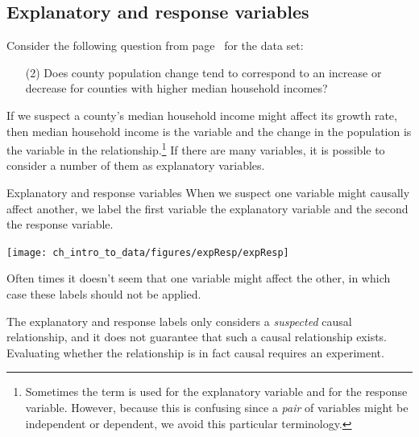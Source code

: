 
\subsection{Explanatory and response variables}
\label{explanatoryAndResponse}



Consider the following question from
page~\pageref{pop_change_v_median_hh_income_question}
for the  data set:
\begin{enumerate}
\item[(2)]
    Does county population change tend to correspond to an increase
    or decrease for counties with higher median household incomes?
\end{enumerate}
If we suspect a county's median household income might affect
its growth rate,
then median household income is the
variable and the change in the population is the
 variable in the
relationship.\footnote{Sometimes the term
 is used for
the explanatory variable and  for
the response variable.
However, because this is confusing since a \emph{pair} of
variables might be independent or dependent, we avoid this
particular terminology.}
If there are many variables, it is possible to consider
a number of them as explanatory variables.


\begin{onebox}{Explanatory and response variables}
When we suspect one variable might causally affect another,
we label the first variable the explanatory variable and the
second the response variable.
\vspace{1mm}

\hspace{10mm}\texttt{[image: ch\_intro\_to\_data/figures/expResp/expResp]}

Often times it doesn't seem that one variable might affect the other,
in which case these labels should not be applied.
\end{onebox}

The explanatory and response labels only considers
a \emph{suspected} causal relationship, and it does not guarantee
that such a causal relationship exists.
Evaluating whether the relationship is in fact causal
requires an experiment.


